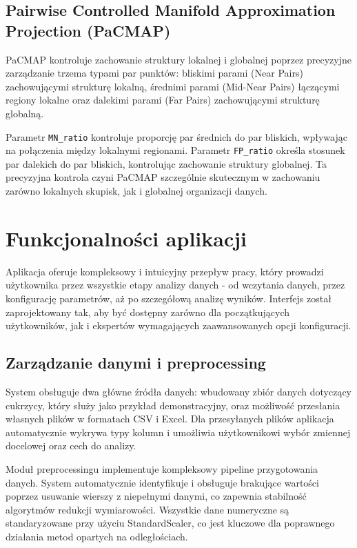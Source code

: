 \documentclass[a4paper, 12pt]{article}
\begin{document}
\subsection{Pairwise Controlled Manifold Approximation Projection (PaCMAP)}

PaCMAP kontroluje zachowanie struktury lokalnej i globalnej poprzez precyzyjne zarządzanie trzema typami par punktów: bliskimi parami (Near Pairs) zachowującymi strukturę lokalną, średnimi parami (Mid-Near Pairs) łączącymi regiony lokalne oraz dalekimi parami (Far Pairs) zachowującymi strukturę globalną.

Parametr \texttt{MN\_ratio} kontroluje proporcję par średnich do par bliskich, wpływając na połączenia między lokalnymi regionami. Parametr \texttt{FP\_ratio} określa stosunek par dalekich do par bliskich, kontrolując zachowanie struktury globalnej. Ta precyzyjna kontrola czyni PaCMAP szczególnie skutecznym w zachowaniu zarówno lokalnych skupisk, jak i globalnej organizacji danych.

\section{Funkcjonalności aplikacji}

Aplikacja oferuje kompleksowy i intuicyjny przepływ pracy, który prowadzi użytkownika przez wszystkie etapy analizy danych - od wczytania danych, przez konfigurację parametrów, aż po szczegółową analizę wyników. Interfejs został zaprojektowany tak, aby być dostępny zarówno dla początkujących użytkowników, jak i ekspertów wymagających zaawansowanych opcji konfiguracji.

\subsection{Zarządzanie danymi i preprocessing}

System obsługuje dwa główne źródła danych: wbudowany zbiór danych dotyczący cukrzycy, który służy jako przykład demonstracyjny, oraz możliwość przesłania własnych plików w formatach CSV i Excel. Dla przesyłanych plików aplikacja automatycznie wykrywa typy kolumn i umożliwia użytkownikowi wybór zmiennej docelowej oraz cech do analizy.

Moduł preprocessingu implementuje kompleksowy pipeline przygotowania danych. System automatycznie identyfikuje i obsługuje brakujące wartości poprzez usuwanie wierszy z niepełnymi danymi, co zapewnia stabilność algorytmów redukcji wymiarowości. Wszystkie dane numeryczne są standaryzowane przy użyciu StandardScaler, co jest kluczowe dla poprawnego działania metod opartych na odległościach.
\end{document}
